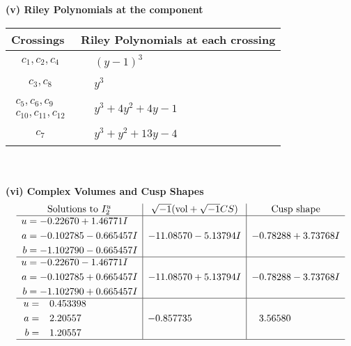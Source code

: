 \documentclass[1p]{elsarticle_modified}
\theoremstyle{definition}
\newcommand{\I}{\sqrt{-1}}
\begin{document}
\flushleft \textbf{(v) Riley Polynomials at the component}\newline \\
\begin{tabular}{m{50pt}|m{274pt}}
Crossings & \hspace{64pt}Riley Polynomials at each crossing \\
\hline $$\begin{aligned}c_{1},c_{2},c_{4}\end{aligned}$$&$\begin{aligned}
&(y-1)^3
\end{aligned}$\\
\hline $$\begin{aligned}c_{3},c_{8}\end{aligned}$$&$\begin{aligned}
&y^3
\end{aligned}$\\
\hline $$\begin{aligned}c_{5},c_{6},c_{9}\\c_{10},c_{11},c_{12}\end{aligned}$$&$\begin{aligned}
&y^3+4 y^2+4 y-1
\end{aligned}$\\
\hline $$\begin{aligned}c_{7}\end{aligned}$$&$\begin{aligned}
&y^3+y^2+13 y-4
\end{aligned}$\\
\hline
\end{tabular}\\~\\
\newpage\flushleft \textbf{(vi) Complex Volumes and Cusp Shapes}
$$\begin{array}{c|c|c}  
\text{Solutions to }I^u_{2}& \I (\text{vol} + \sqrt{-1}CS) & \text{Cusp shape}\\
 \hline 
\begin{aligned}
u &= -0.22670 + 1.46771 I \\
a &= -0.102785 - 0.665457 I \\
b &= -1.102790 - 0.665457 I\end{aligned}
 & -11.08570 - 5.13794 I & -0.78288 + 3.73768 I \\ \hline\begin{aligned}
u &= -0.22670 - 1.46771 I \\
a &= -0.102785 + 0.665457 I \\
b &= -1.102790 + 0.665457 I\end{aligned}
 & -11.08570 + 5.13794 I & -0.78288 - 3.73768 I \\ \hline\begin{aligned}
u &= \phantom{-}0.453398\phantom{ +0.000000I} \\
a &= \phantom{-}2.20557\phantom{ +0.000000I} \\
b &= \phantom{-}1.20557\phantom{ +0.000000I}\end{aligned}
 & -0.857735\phantom{ +0.000000I} & \phantom{-}3.56580\phantom{ +0.000000I}\\
 \hline 
 \end{array}$$\newpage\newpage\renewcommand{\arraystretch}{1}
\end{document}

